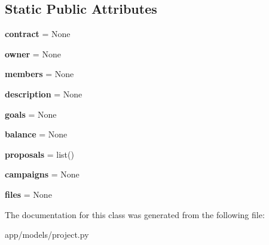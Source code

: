 \subsection*{Static Public Attributes}
\begin{DoxyCompactItemize}
\item 
\mbox{\label{classapp_1_1models_1_1project_1_1_project_document_ac9f81b32602ae0760ecc4c01043d294b}} 
{\bfseries contract} = None
\item 
\mbox{\label{classapp_1_1models_1_1project_1_1_project_document_a8429b44aef1a129ceb8ea9811a101118}} 
{\bfseries owner} = None
\item 
\mbox{\label{classapp_1_1models_1_1project_1_1_project_document_a3a3d2e4e147f91d449bc6377085c8121}} 
{\bfseries members} = None
\item 
\mbox{\label{classapp_1_1models_1_1project_1_1_project_document_a9f3e25ceab712f837018c91f4d63519a}} 
{\bfseries description} = None
\item 
\mbox{\label{classapp_1_1models_1_1project_1_1_project_document_a6dbe738ae6abfc00945d36d6fe83e7ca}} 
{\bfseries goals} = None
\item 
\mbox{\label{classapp_1_1models_1_1project_1_1_project_document_a5f059123a91d18a53f1b483a7aaafd84}} 
{\bfseries balance} = None
\item 
\mbox{\label{classapp_1_1models_1_1project_1_1_project_document_a173b03e48336d2032c27494225b1c589}} 
{\bfseries proposals} = list()
\item 
\mbox{\label{classapp_1_1models_1_1project_1_1_project_document_aeefe96744f1769d84890005669f7f8b5}} 
{\bfseries campaigns} = None
\item 
\mbox{\label{classapp_1_1models_1_1project_1_1_project_document_ad98ed980ff4699c2249798ffe408cebb}} 
{\bfseries files} = None
\end{DoxyCompactItemize}


The documentation for this class was generated from the following file\+:\begin{DoxyCompactItemize}
\item 
app/models/project.\+py\end{DoxyCompactItemize}
